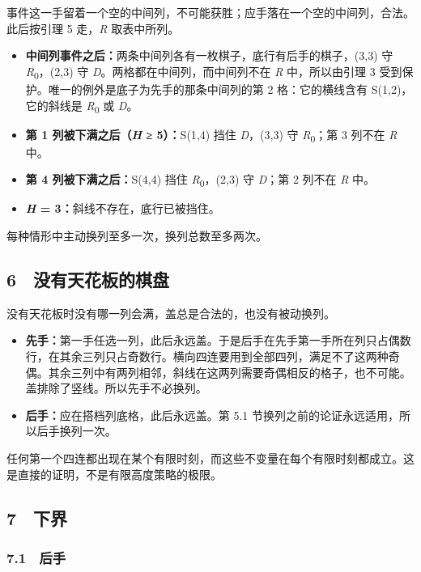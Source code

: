 \documentclass[
  a4paper,
]{article}
\providecommand{\tightlist}{%
  \setlength{\itemsep}{0pt}\setlength{\parskip}{0pt}}
\begin{document}
事件这一手留着一个空的中间列，不可能获胜；应手落在一个空的中间列，合法。此后按引理
5 走，\emph{R} 取表中所列。

\begin{itemize}
\tightlist
\item
  \textbf{中间列事件之后：}两条中间列各有一枚棋子，底行有后手的棋子，(3,3)
  守 \emph{R}\textsubscript{0}，(2,3) 守
  \emph{D}。两格都在中间列，而中间列不在 \emph{R} 中，所以由引理 3
  受到保护。唯一的例外是底子为先手的那条中间列的第 2 格：它的横线含有
  S(1,2)，它的斜线是 \emph{R}\textsubscript{0} 或 \emph{D}。
\item
  \textbf{第 1 列被下满之后（\emph{H} ≥ 5）：}S(1,4) 挡住
  \emph{D}，(3,3) 守 \emph{R}\textsubscript{0}；第 3 列不在 \emph{R}
  中。
\item
  \textbf{第 4 列被下满之后：}S(4,4) 挡住
  \emph{R}\textsubscript{0}，(2,3) 守 \emph{D}；第 2 列不在 \emph{R}
  中。
\item
  \textbf{\emph{H} = 3：}斜线不存在，底行已被挡住。
\end{itemize}

每种情形中主动换列至多一次，换列总数至多两次。

\subsection{6 没有天花板的棋盘}\label{ux6ca1ux6709ux5929ux82b1ux677fux7684ux68cbux76d8}

没有天花板时没有哪一列会满，盖总是合法的，也没有被动换列。

\begin{itemize}
\tightlist
\item
  \textbf{先手：}第一手任选一列，此后永远盖。于是后手在先手第一手所在列只占偶数行，在其余三列只占奇数行。横向四连要用到全部四列，满足不了这两种奇偶。其余三列中有两列相邻，斜线在这两列需要奇偶相反的格子，也不可能。盖排除了竖线。所以先手不必换列。
\item
  \textbf{后手：}应在搭档列底格，此后永远盖。第 5.1
  节换列之前的论证永远适用，所以后手换列一次。
\end{itemize}

任何第一个四连都出现在某个有限时刻，而这些不变量在每个有限时刻都成立。这是直接的证明，不是有限高度策略的极限。

\subsection{7 下界}\label{ux4e0bux754c}

\subsubsection{7.1 后手}\label{ux540eux624b-1}
\end{document}
